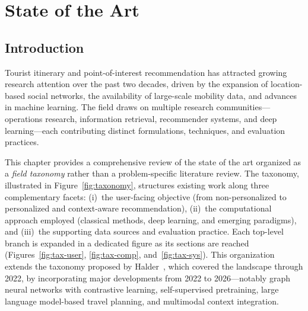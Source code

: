 \chapter{State of the Art}
\label{ch:sota}

\section{Introduction}
\label{sec:sota-intro}

Tourist itinerary and point-of-interest recommendation has attracted growing research attention over the past two decades, driven by the expansion of location-based social networks, the availability of large-scale mobility data, and advances in machine learning. The field draws on multiple research communities---operations research, information retrieval, recommender systems, and deep learning---each contributing distinct formulations, techniques, and evaluation practices.

This chapter provides a comprehensive review of the state of the art organized as a \emph{field taxonomy} rather than a problem-specific literature review. The taxonomy, illustrated in Figure~\ref{fig:taxonomy}, structures existing work along three complementary facets: (i)~the user-facing objective (from non-personalized to personalized and context-aware recommendation), (ii)~the computational approach employed (classical methods, deep learning, and emerging paradigms), and (iii)~the supporting data sources and evaluation practice. Each top-level branch is expanded in a dedicated figure as its sections are reached (Figures~\ref{fig:tax-user}, \ref{fig:tax-comp}, and~\ref{fig:tax-sys}). This organization extends the taxonomy proposed by Halder~\cite{halder2022thesis}, which covered the landscape through 2022, by incorporating major developments from 2022 to 2026---notably graph neural networks with contrastive learning, self-supervised pretraining, large language model-based travel planning, and multimodal context integration.




